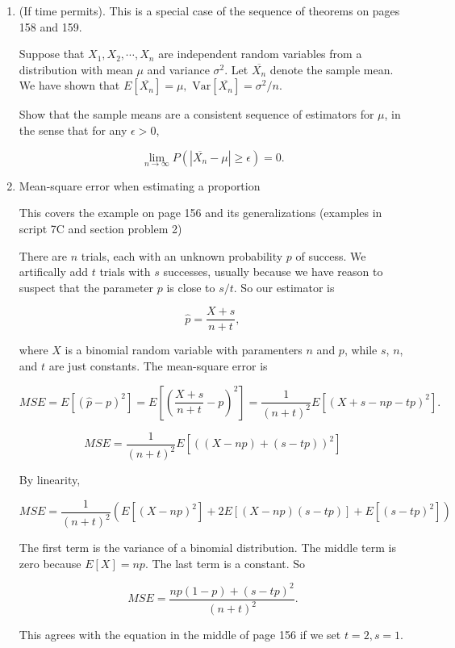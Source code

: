 \documentclass[12pt]{article}
\begin{document}
\begin{enumerate}
\item (If time permits). This is a special case of the sequence of theorems on pages 158 and 159.

Suppose that $X_1, X_2, \cdots, X_n$ are independent random variables from a distribution with mean $\mu$ and variance $\sigma^2$. Let $\overline{X_n}$ denote the sample mean. We have shown that $E[\overline{X_n}] = \mu, \text{ Var} [\overline{X_n}] = \sigma^2/n.$

Show that the sample means are a consistent sequence of estimators for $\mu$, in the sense that for any $\epsilon > 0$,

$$\lim_{n \rightarrow \infty} P(|\overline{X_n}-\mu| \geq \epsilon) = 0.$$


\pagebreak

\item Mean-square error when estimating a proportion

This covers the example on page 156 and its generalizations (examples in script 7C and section problem 2)

There are $n$ trials, each with an unknown probability $p$ of success. We artifically add $t$ trials with $s$ successes, usually because we have reason to suspect that the parameter $p$ is close to $s/t.$ So our estimator is

$$\hat{p} = \frac{X + s}{n +t},$$

where $X$ is a binomial random variable with paramenters $n$ and $p$, while $s$, $n$, and $t$ are just constants.
The mean-square error is 

$$MSE = E[(\hat{p} -p)^2] = E[(\frac{X + s}{n +t} - p)^2] = \frac{1}{(n+t)^2} E[(X + s -np - tp)^2].$$

$$MSE = \frac{1}{(n+t)^2} E[((X -np)+ (s- tp))^2]$$

By linearity,

$$MSE = \frac{1}{(n+t)^2} (E[(X -np)^2]+ 2 E[(X -np) (s- tp)] + E[ (s- tp)^2])$$

The first term is the variance of a binomial distribution. The middle term is zero because $E[X] = np$. The last term is a constant. So

$$MSE = \frac{np(1-p) + (s-tp)^2} {(n+t)^2}.$$

This agrees with the equation in the middle of page 156 if we set $t = 2, s = 1.$



\end{enumerate}

\pagebreak
\end{document}

